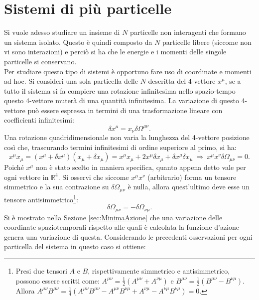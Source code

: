 \section{Sistemi di più particelle}
Si vuole adesso studiare un insieme di $N$ particelle non interagenti che formano un sistema isolato.
Questo è quindi composto da $N$ particelle libere (siccome non vi sono interazioni) e perciò si ha che le energie e i momenti delle singole particelle si conservano.\\

Per studiare questo tipo di sistemi è opportuno fare uso di coordinate e momenti ad hoc. Si consideri una sola particella delle $N$ descritta del 4-vettore $x^\mu$, se a tutto il sistema si fa compiere una rotazione infinitesima nello spazio-tempo questo 4-vettore muterà di una quantità infinitesima. La variazione di questo 4-vettore può essere espressa in termini di una trasformazione lineare con coefficienti infinitesimi:
\begin{equation*}
    \delta x^\mu=x_\nu\delta \Omega^{\mu\nu}.
\end{equation*}
Una rotazione quadridimensionale non varia la lunghezza del 4-vettore posizione così che, trascurando termini infinitesimi di ordine superiore al primo, si ha: 
\begin{equation*}
    x^\mu x_\mu=(x^\mu+\delta x^\mu)(x_\mu+\delta x_\mu)= x^\mu x_\mu+2x^\mu \delta x_\mu+ \delta x^\mu\delta x_\mu\ \Rightarrow \ x^\mu x^\nu \delta \Omega_{\mu \nu}=0.
\end{equation*}
Poiché $x^\mu$ non è stato scelto in maniera specifica, quanto appena detto vale per ogni vettore in $\mathbb{R}^4$. Si osservi che siccome $x^\mu x^\nu$ (arbitrario) forma un tensore simmetrico e la sua contrazione su $\delta \Omega_{\mu \nu}$ è nulla, allora quest'ultimo deve esse un tensore antisimmetrico\footnote{Presi due tensori $A$ e $B$, rispettivamente simmetrico e antisimmetrico, possono essere scritti come: $A^{\mu\nu}=\frac{1}{2}(A^{\mu\nu}+A^{\nu\mu})$ e $B^{\mu\nu}=\frac{1}{2}(B^{\mu\nu}-B^{\nu\mu})$. Allora $A^{\mu\nu}B^{\mu\nu}=\frac{1}{4}(A^{\mu\nu}B^{\mu\nu}-A^{\mu\nu}B^{\nu\mu}+A^{\nu\mu}-A^{\nu\mu}B^{\nu\mu})=0$.}:
\begin{equation}
    \delta\Omega_{\mu \nu}=-\delta\Omega_{\nu \mu}.
\end{equation}
Si è mostrato nella Sezione \ref{sec:MinimaAzione} che una variazione delle coordinate spaziotemporali rispetto alle quali è calcolata la funzione d'azione genera una variazione di questa. Considerando le precedenti osservazioni per ogni particella del sistema in questo caso si ottiene:
